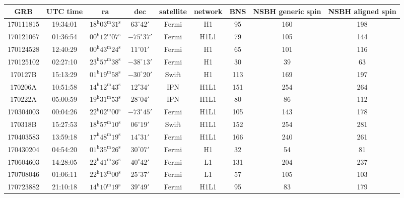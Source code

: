 \documentclass[11pt]{cuthesis}
\begin{document}
\begin{landscape}
\begin{table} 
\begin{tabular}{ccccccccc}
\hline
 GRB & UTC time & ra & dec & satellite & network & BNS & NSBH generic spin & NSBH aligned spin \\
\hline
170111815 & 19:34:01  & $18^{\mathrm{h}}03^{\mathrm{m}}31^{\mathrm{s}}$ & $63^{\circ}42'$ &  Fermi   & H1     & 95  & 160 & 198 \\
170121067 & 01:36:54  & $00^{\mathrm{h}}12^{\mathrm{m}}07^{\mathrm{s}}$ & $-75^{\circ}37'$ & Fermi   & H1L1   & 79  & 105 & 144 \\
170124528 & 12:40:29  & $00^{\mathrm{h}}43^{\mathrm{m}}24^{\mathrm{s}}$ & $11^{\circ}01'$ &  Fermi  & H1      & 65  & 101 & 116 \\
170125102 & 02:27:10  & $23^{\mathrm{h}}57^{\mathrm{m}}38^{\mathrm{s}}$ & $-38^{\circ}13'$ & Fermi   & H1     & 30  & 39  & 63 \\
170127B   & 15:13:29  & $01^{\mathrm{h}}19^{\mathrm{m}}58^{\mathrm{s}}$ & $-30^{\circ}20'$ & Swift   & H1     & 113 & 169 & 197 \\
170206A   & 10:51:58  & $14^{\mathrm{h}}12^{\mathrm{m}}43^{\mathrm{s}}$ & $12^{\circ}34'$ &  IPN   & H1L1     & 151 & 254 & 264 \\
170222A   & 05:00:59  & $19^{\mathrm{h}}31^{\mathrm{m}}53^{\mathrm{s}}$ & $28^{\circ}04'$ &  IPN   & H1L1     & 80  & 86  & 112 \\
170304003 & 00:04:26  & $22^{\mathrm{h}}02^{\mathrm{m}}00^{\mathrm{s}}$ & $-73^{\circ}45'$ & Fermi   & H1L1   & 105 & 143 & 178 \\
170318B   & 15:27:53  & $18^{\mathrm{h}}57^{\mathrm{m}}10^{\mathrm{s}}$ & $06^{\circ}19'$ &  Swift   & H1L1   & 152 & 254 & 281 \\
170403583 & 13:59:18  & $17^{\mathrm{h}}48^{\mathrm{m}}19^{\mathrm{s}}$ & $14^{\circ}31'$ &  Fermi   & H1L1   & 166 & 240 & 261 \\
170430204 & 04:54:20  & $01^{\mathrm{h}}35^{\mathrm{m}}26^{\mathrm{s}}$ & $30^{\circ}07'$ &  Fermi   & H1     & 32  & 54  & 81 \\
170604603 & 14:28:05  & $22^{\mathrm{h}}41^{\mathrm{m}}36^{\mathrm{s}}$ & $40^{\circ}42'$ &  Fermi   & L1     & 131 & 204 & 237 \\
170708046 & 01:06:11  & $22^{\mathrm{h}}13^{\mathrm{m}}00^{\mathrm{s}}$ & $25^{\circ}37'$ &  Fermi   & L1     & 57  & 105 & 103 \\
170723882 & 21:10:18  & $14^{\mathrm{h}}10^{\mathrm{m}}19^{\mathrm{s}}$ & $39^{\circ}49'$ &  Fermi   & H1L1   & 95  & 83  & 179 \\

\end{tabular}
\end{table}
\end{landscape}
\end{document}
